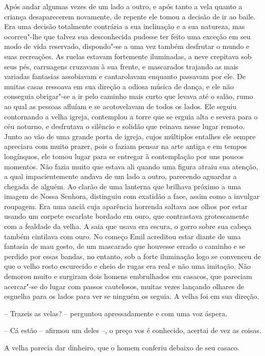 Após andar algumas vezes de um lado a outro, e após tanto a vela quanto
a criança desaparecerem novamente, de repente ele tomou a decisão de ir
ao baile. Era uma decisão totalmente contrária a sua inclinação e a sua
\mbox{natureza}, mas ocorreu"-lhe que talvez sua desconhecida pudesse ter feito
uma exceção em seu modo de vida reservado, dispondo"-se a uma vez também
desfrutar o mundo e suas recreações. As ruelas estavam fortemente
iluminadas, a neve crepitava sob seus pés, carruagens cruzavam à sua
frente, e mascarados trajando as mais variadas fantasias assobiavam e
cantarolavam enquanto passavam por ele. De muitas casas ressoava em sua
direção a odiosa música de dança, e ele não conseguia obrigar"-se a ir
pelo caminho mais curto que levava até o salão, rumo ao qual as pessoas
afluíam e se acotovelavam de todos os lados. Ele seguiu contornando a
velha igreja, contemplou a torre que se erguia alta e severa para o céu
noturno, e desfrutava o silêncio e solidão que reinava nesse lugar
remoto. Junto ao vão de uma grande porta de igreja, cujos múltiplos
entalhes ele sempre apreciara com muito prazer, pois o faziam pensar na
arte antiga e em tempos longínquos, ele tomou lugar para se entregar à
contemplação por uns poucos momentos. Não fazia muito que estava ali
quando uma figura atraiu sua atenção, a qual impacientemente andava de
um lado a outro, parecendo aguardar a chegada de alguém. Ao clarão de
uma lanterna que brilhava próximo a uma imagem de Nossa Senhora,
distinguiu com exatidão a face, assim como a invulgar roupagem. Era uma
anciã cuja aparência horrenda saltava aos olhos por estar usando um
corpete escarlate bordado em ouro, que contrastava grotescamente com a
fealdade da velha. A saia que usava era escura, o gorro sobre sua
cabeça também cintilava com ouro. No começo Emil acreditou estar diante
de uma fantasia de mau gosto, de um mascarado que houvesse errado o
caminho e se perdido por essas bandas, no entanto, sob a forte
iluminação logo se convenceu de que o velho rosto escurecido e cheio de
rugas era real e não uma imitação. Não demorou muito e surgiram dois
homens embrulhados em casacos, que pareciam acercar"-se do lugar com
passos cautelosos, muitas vezes lançando olhares de esguelha para os
lados para ver se ninguém os seguia. A velha  foi em sua direção.

-- Trazeis as velas? -- perguntou apressadamente e com uma voz áspera.

-- Cá estão -- afirmou um deles --, o preço vos é conhecido, acertai de
vez as coisas.

A velha parecia dar dinheiro, que o homem conferiu debaixo de seu
casaco.

